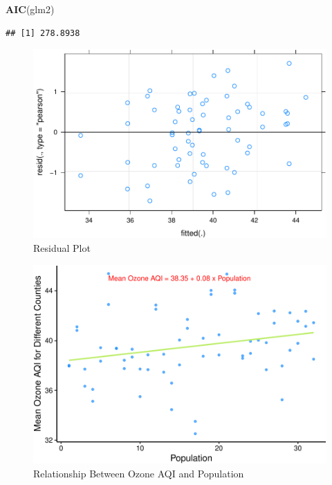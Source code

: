 \documentclass[12pt,]{article}
\newenvironment{Shaded}{\begin{snugshade}}{\end{snugshade}}
\newcommand{\KeywordTok}[1]{\textcolor[rgb]{0.13,0.29,0.53}{\textbf{#1}}}
\newcommand{\NormalTok}[1]{#1}
\begin{document}
\begin{Shaded}
\begin{Highlighting}[]
\KeywordTok{AIC}\NormalTok{(glm2)}
\end{Highlighting}
\end{Shaded}

\begin{verbatim}
## [1] 278.8938
\end{verbatim}

\pagebreak

\begin{figure}
\centering
\includegraphics{Xia_ENV_872_Project_files/figure-latex/Final visualization 5-1.pdf}
\caption{Residual Plot}
\end{figure}

\pagebreak

\begin{figure}
\centering
\includegraphics{Xia_ENV_872_Project_files/figure-latex/Final visualization 4-1.pdf}
\caption{Relationship Between Ozone AQI and Population}
\end{figure}
\end{document}
